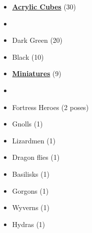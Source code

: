 \begin{multicols*}{3}
\begin{itemize}[leftmargin=0pt, label={}, noitemsep]
  \item \textbf{\small{\underline{Acrylic Cubes}}} (30)
  \item
  \item Dark Green (20)
  \item Black (10)
\end{itemize}

\begin{itemize}[leftmargin=0pt, label={}, noitemsep]
  \item \textbf{\small{\underline{Miniatures}}} (9)
  \item
  \item Fortress Heroes (2 poses)
  \item Gnolls (1)
  \item Lizardmen (1)
  \item Dragon flies (1)
  \item Basilisks (1)
  \item Gorgons (1)
  \item Wyverns (1)
  \item Hydras (1)
\end{itemize}

\columnbreak


\end{multicols*}
